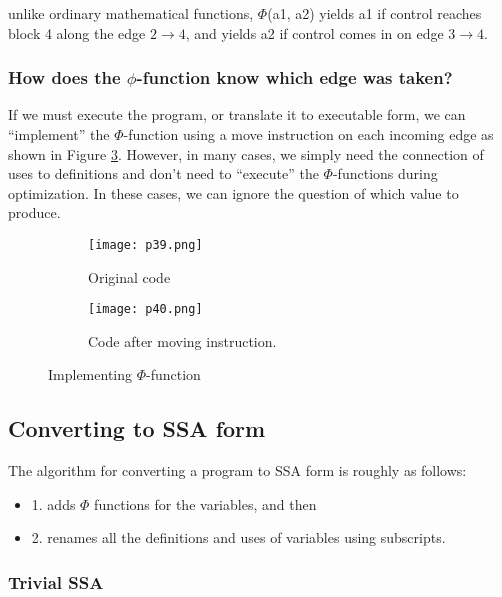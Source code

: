 unlike ordinary mathematical functions, $\Phi$(a1, a2) yields a1 if control reaches block 4 along the edge $2 \rightarrow 4$, and yields a2 if control comes in on edge $3 \rightarrow 4$.


\subsubsection{How does the $\phi$-function know which edge was taken?}


If we must execute the program, or translate it to executable form, we can “implement” the $\Phi$-function using a move instruction on each incoming edge as shown in Figure \ref{fig:p39-40}. However, in many cases, we simply need the connection of uses to definitions and don’t need to “execute” the $\Phi$-functions during optimization. In these cases, we can ignore the question of which value to produce.

\begin{figure}[htb]
	\centering
	\begin{subfigure}{0.3\textwidth}
		\centering
		\texttt{[image: p39.png]}
		\caption{Original code}
		\label{fig:p39}
	\end{subfigure}
	\begin{subfigure}{0.3\textwidth}
		\centering
		\texttt{[image: p40.png]}
		\caption{Code after moving instruction.}
		\label{fig:p40}
	\end{subfigure}
	\caption{Implementing $\Phi$-function}
	\label{fig:p39-40}
\end{figure}




\subsection{Converting to SSA form}

The algorithm for converting a program to SSA form is roughly as follows:

\begin{itemize}
	\item 1. adds $\Phi$ functions for the variables, and then
	\item 2. renames all the definitions and uses of variables using subscripts.
\end{itemize}




\subsubsection{Trivial SSA}

